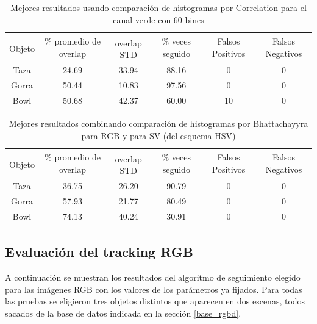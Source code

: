 \begin{table}
	\begin{tabular}{|c|c|c|c|c|c|}
	    \hline
	    & \multirow{2}{2.4cm}{\% promedio de overlap} & & \multirow{2}{2cm}{\% veces seguido} & \multirow{2}{1.6cm}{Falsos Positivos} & \multirow{2}{1.6cm}{Falsos Negativos}\\
		Objeto & & overlap STD & & &\\
	    \hline
	    Taza   & 24.69      & 33.94       & 88.16             & 0                & 0\\
	    \hline
	    Gorra  & 50.44      & 10.83       & 97.56             & 0                & 0\\
	    \hline
	    Bowl   & 50.68      & 42.37       & 60.00             & 10               & 0\\
	    \hline
    \end{tabular}
	\caption{Mejores resultados usando comparación de histogramas por Correlation para el canal verde con 60 bines}
	\label{pruebas_definitivas_correl_green}
\end{table}

\begin{table}
	\begin{tabular}{|c|c|c|c|c|c|}
	    \hline
	    & \multirow{2}{2.4cm}{\% promedio de overlap} & & \multirow{2}{2cm}{\% veces seguido} & \multirow{2}{1.6cm}{Falsos Positivos} & \multirow{2}{1.6cm}{Falsos Negativos}\\
		Objeto & & overlap STD & & &\\
	    \hline
	    Taza   & 36.75      & 26.20       & 90.79             & 0                & 0\\
	    \hline
	    Gorra  & 57.93      & 21.77       & 80.49             & 0                & 0\\
	    \hline
	    Bowl   & 74.13      & 40.24       & 30.91             & 0                & 0\\
	    \hline
    \end{tabular}
	\caption{Mejores resultados combinando comparación de histogramas por Bhattachayyra para RGB y para SV (del esquema HSV)}
	\label{pruebas_definitivas_rgb_sv}
\end{table}



\subsection{Evaluación del tracking RGB}
A continuación se muestran los resultados del algoritmo de seguimiento elegido para las imágenes RGB con los valores de los parámetros ya fijados. Para todas las pruebas se eligieron tres objetos distintos que aparecen en dos escenas, todos sacados de la base de datos indicada en la sección \ref{base_rgbd}.

